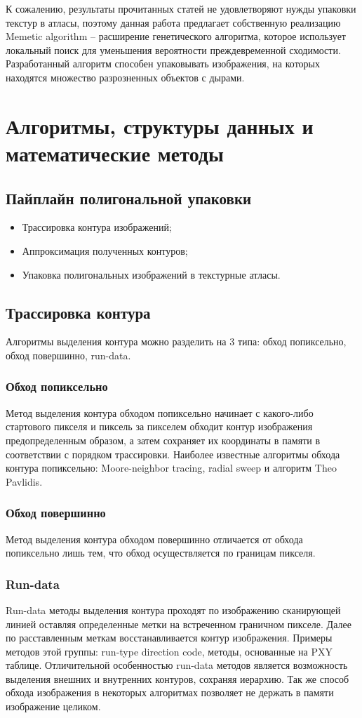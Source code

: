 \documentclass{fefu_thesis/cls/fefu}
\begin{document}
    К сожалению, результаты прочитанных статей не удовлетворяют нужды упаковки текстур в атласы, поэтому данная работа предлагает собственную реализацию Memetic algorithm -- расширение генетического алгоритма, которое использует локальный поиск для уменьшения вероятности преждевременной сходимости. Разработанный алгоритм способен упаковывать изображения, на которых находятся множество разрозненных объектов с дырами.

    \section{Алгоритмы, структуры данных и математические методы}
    \subsection{Пайплайн полигональной упаковки}
    \begin{itemize}
        \item Трассировка контура изображений;
        \item Аппроксимация полученных контуров;
        \item Упаковка полигональных изображений в текстурные атласы.
    \end{itemize}
    \subsection{Трассировка контура}
    Алгоритмы выделения контура можно разделить на 3 типа: обход попиксельно, обход повершинно, run-data.
    \subsubsection{Обход попиксельно}
    Метод выделения контура обходом попиксельно начинает с какого-либо стартового пикселя и пиксель за пикселем обходит контур изображения предопределенным образом, а затем сохраняет их координаты в памяти в соответствии с порядком трассировки. Наиболее известные алгоритмы обхода контура попиксельно: Moore-neighbor tracing\cite{MoorNeighbor}, radial sweep\cite{RadialSweep} и алгоритм Theo Pavlidis\cite{TheoPavlidis}.
    \subsubsection{Обход повершинно}
    Метод выделения контура обходом повершинно отличается от обхода попиксельно лишь тем, что обход осуществляется по границам пикселя.
    \subsubsection{Run-data}
    Run-data методы выделения контура проходят по изображению сканирующей линией оставляя определенные метки на встреченном граничном пикселе. Далее по расставленным меткам восстанавливается контур изображения. Примеры методов этой группы: run-type direction code\cite{Miyatake1997}, методы, основанные на PXY таблице\cite{Shoji}. Отличительной особенностью run-data методов является возможность выделения внешних и внутренних контуров, сохраняя иерархию. Так же способ обхода изображения в некоторых алгоритмах позволяет не держать в памяти изображение целиком.
\end{document}
